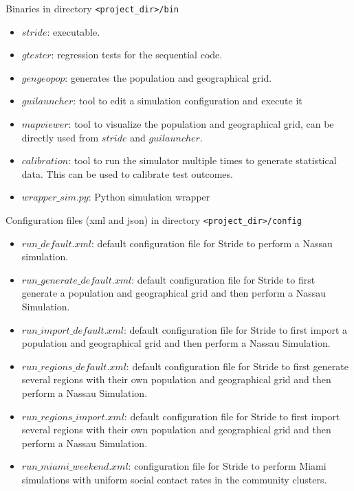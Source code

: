 \begin{compactitem}
    \item Binaries 
    		in directory \texttt{<project\_dir>/bin}
      	\begin{itemize}
        		\item $stride$: executable.
        		\item $gtester$: regression tests for the sequential code.
                \item $gengeopop$: generates the population and geographical grid.
                \item $guilauncher$: tool to edit a simulation configuration and execute it
                \item $mapviewer$: tool to visualize the population and geographical grid, can be directly used from $stride$ and $guilauncher$.
                \item $calibration$: tool to run the simulator multiple times to generate statistical data. This can be used to calibrate test outcomes.
        		\item $wrapper\_sim.py$: Python simulation wrapper  		
        \end{itemize}
    \item Configuration files (xml and json)
      	in directory \texttt{<project\_dir>/config}
      	\begin{itemize}
		\item $run\_default.xml$: default configuration file for Stride to perform a Nassau simulation.
        \item $run\_generate\_default.xml$: default configuration file for Stride to first generate a population and geographical grid and then perform a Nassau Simulation.
        \item $run\_import\_default.xml$: default configuration file for Stride to first import a population and geographical grid and then perform a Nassau Simulation.
        \item $run\_regions\_default.xml$: default configuration file for Stride to first generate several regions with their own population and geographical grid and then perform a Nassau Simulation.
        \item $run\_regions\_import.xml$: default configuration file for Stride to first import several regions with their own population and geographical grid and then perform a Nassau Simulation.
        \item $run\_miami\_weekend.xml$: configuration file for Stride to perform Miami simulations with uniform social contact rates in the community clusters.

\end{itemize}
\end{compactitem}
